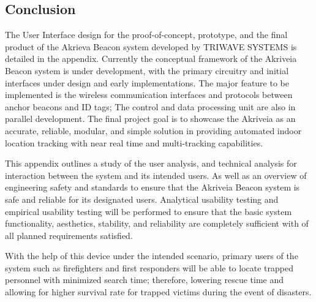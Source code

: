 

\subsection{Conclusion}
\medskip
The User Interface design for the proof-of-concept, prototype, and the final product of the Akrieva Beacon system developed by TRIWAVE SYSTEMS is detailed in the appendix. Currently the conceptual framework of the Akriveia Beacon system is under development, with the primary circuitry and initial interfaces under design and early implementations. The major feature to be implemented is the wireless communication interfaces and protocols between anchor beacons and ID tags; The control and data processing unit are also in parallel development. The final project goal is to showcase the Akriveia as an accurate, reliable, modular, and simple solution in providing automated indoor location tracking with near real time and multi-tracking capabilities.  

\bigskip
This appendix outlines a study of the user analysis, and technical analysis for interaction between the system and its intended users. As well as an overview of engineering safety and standards to ensure that the Akriveia Beacon system is safe and reliable for its designated users. Analytical usability testing and empirical usability testing will be performed to ensure that the basic system functionality, aesthetics, stability, and reliability are completely sufficient with of all planned requirements satisfied. 

\bigskip
With the help of this device under the intended scenario, primary users of the system such as firefighters and first responders will be able to locate trapped personnel with minimized search time; therefore, lowering rescue time and allowing for higher survival rate for trapped victims during the event of disasters. 













